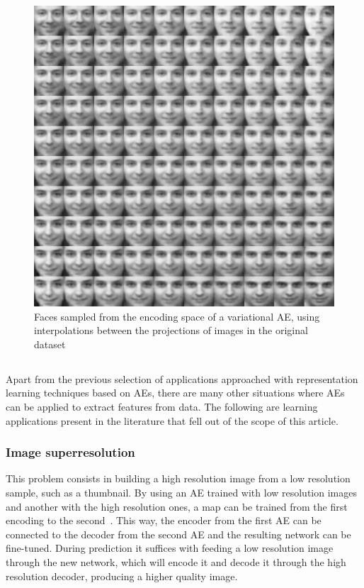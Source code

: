 \begin{figure}[ht!]
    \centering
    \includegraphics[width=.8\linewidth]{variational-matrix.png}
    \caption[Faces sampled from the encoding space of a variational AE.]{\label{fig:sampledfaces}Faces sampled from the encoding space of a variational AE, using interpolations between the projections of images in the original dataset}
\end{figure}

\subsection{}\label{sec:oth}

Apart from the previous selection of applications approached with representation learning techniques based on AEs, there are many other situations where AEs can be applied to extract features from data. The following are learning applications present in the literature that fell out of the scope of this article.

\subsubsection{Image superresolution} This problem consists in building a high resolution image from a low resolution sample, such as a thumbnail. By using an AE trained with low resolution images and another with the high resolution ones, a map can be trained from the first encoding to the second~. This way, the encoder from the first AE can be connected to the decoder from the second AE and the resulting network can be fine-tuned. During prediction it suffices with feeding a low resolution image through the new network, which will encode it and decode it through the high resolution decoder, producing a higher quality image.

